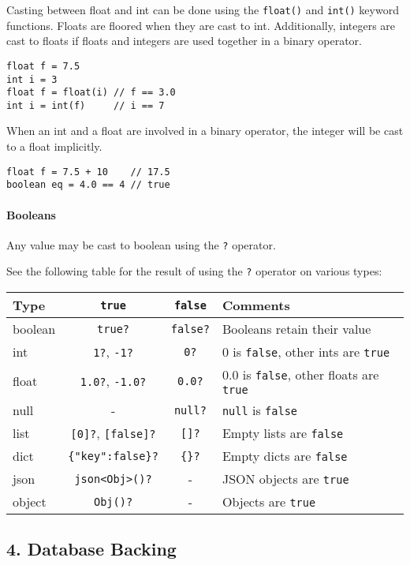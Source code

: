 \documentclass[]{article}
\begin{document}
Casting between float and int can be done using the \texttt{float()} and
\texttt{int()} keyword functions. Floats are floored when they are cast
to int. Additionally, integers are cast to floats if floats and integers
are used together in a binary operator.

\begin{verbatim}
float f = 7.5
int i = 3
float f = float(i) // f == 3.0
int i = int(f)     // i == 7
\end{verbatim}

When an int and a float are involved in a binary operator, the integer
will be cast to a float implicitly.

\begin{verbatim}
float f = 7.5 + 10    // 17.5
boolean eq = 4.0 == 4 // true
\end{verbatim}

\paragraph{Booleans}\label{booleans-1}

Any value may be cast to boolean using the \texttt{?} operator.

See the following table for the result of using the \texttt{?} operator
on various types:

\begin{longtable}[c]{@{}lccl@{}}
\toprule
Type & \texttt{true} & \texttt{false} & Comments\tabularnewline
\midrule
\endhead
boolean & \texttt{true?} & \texttt{false?} & Booleans retain their
value\tabularnewline
int & \texttt{1?}, \texttt{-1?} & \texttt{0?} & 0 is \texttt{false},
other ints are \texttt{true}\tabularnewline
float & \texttt{1.0?}, \texttt{-1.0?} & \texttt{0.0?} & 0.0 is
\texttt{false}, other floats are \texttt{true}\tabularnewline
null & - & \texttt{null?} & \texttt{null} is
\texttt{false}\tabularnewline
list & \texttt{{[}0{]}?}, \texttt{{[}false{]}?} & \texttt{{[}{]}?} &
Empty lists are \texttt{false}\tabularnewline
dict & \texttt{\{"key":false\}?} & \texttt{\{\}?} & Empty dicts are
\texttt{false}\tabularnewline
json & \texttt{json\textless{}Obj\textgreater{}()?} & - & JSON objects
are \texttt{true}\tabularnewline
object & \texttt{Obj()?} & - & Objects are \texttt{true}\tabularnewline
\bottomrule
\end{longtable}

\subsection{4. Database Backing}\label{database-backing}
\end{document}
